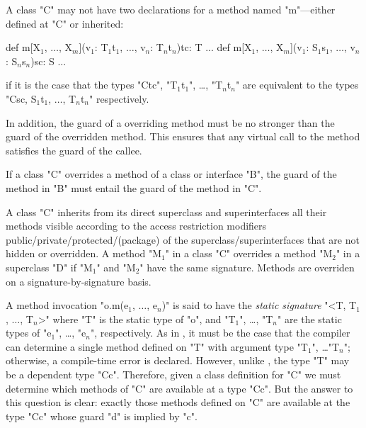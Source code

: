 \begin{staticrule*}
  A class \xcd"C" may not have two declarations for a method named \xcd"m"---either
  defined at \xcd"C" or inherited:
\begin{xtenmath}
def m[X$_1$, $\dots$, X$_m$](v$_1$: T$_1${t$_1$}, $\dots$, v$_n$: T$_n${t$_n$}){tc}: T {...}
def m[X$_1$, $\dots$, X$_m$](v$_1$: S$_1${s$_1$}, $\dots$, v$_n$: S$_n${s$_n$}){sc}: S {...}
\end{xtenmath}
\noindent
if it is the case that the types \xcd"C{tc}", \xcdmath"T$_1${t$_1$}",
\dots, \xcdmath"T$_n${t$_n$}" are
equivalent to the types \xcdmath"C{sc}, S$_1${t$_1$}, $\dots$, T$_n${t$_n$}"
respectively.
\end{staticrule*}

In addition, the guard of a overriding method must be 
no stronger than the guard of the overridden method.   This
ensures that any virtual call to the method
satisfies the guard of the callee.

\begin{staticrule*}
  If a class \xcd"C" overrides a method of a class or interface
  \xcd"B", the guard of the method in \xcd"B" must entail
  the guard of the method in \xcd"C".
\end{staticrule*}

A class \xcd"C" inherits from its direct superclass and superinterfaces all
their methods visible according to the access restriction modifiers
public/private/protected/(package) of the superclass/superinterfaces
that are not hidden or overridden. A method \xcdmath"M$_1$" in a class
\xcd"C" overrides
a method \xcdmath"M$_2$" in a superclass \xcd"D" if
\xcdmath"M$_1$" and \xcdmath"M$_2$" have the same signature.
Methods are overriden on a signature-by-signature basis.

A method invocation \xcdmath"o.m(e$_1$, $\dots$, e$_n$)"
is said to have the {\em static signature}
\xcdmath"<T, T$_1$, $\dots$, T$_n$>" where \xcd"T" is the static type of
\xcd"o", and
\xcdmath"T$_1$",
\dots,
\xcdmath"T$_n$"
are the static types of \xcdmath"e$_1$", \dots, \xcdmath"e$_n$",
respectively.  As in
\Java, it must be the case that the compiler can determine a single
method defined on \xcd"T" with argument type
\xcdmath"T$_1$", \dots \xcdmath"T$_n$"; otherwise, a
compile-time error is declared. However, unlike \Java, the \Xten{} type \xcd"T"
may be a dependent type \xcd"C{c}". Therefore, given a class definition for
\xcd"C" we must determine which methods of \xcd"C" are available at a type
\xcd"C{c}". But the answer to this question is clear: exactly those methods
defined on \xcd"C" are available at the type \xcd"C{c}"
whose guard \xcd"d" is implied by \xcd"c".


